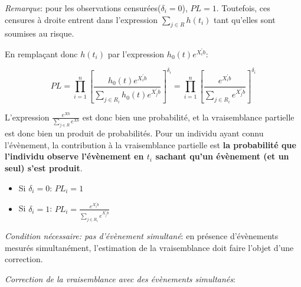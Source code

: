 \documentclass[
  12pt,
  letterpaper,
  DIV=11,
  numbers=noendperiod,
  onepage,
  openany]{scrreprt}
\begin{document}
\emph{Remarque}: pour les observations censurées(\(\delta_i=0\)),
\(PL=1\). Toutefois, ces censures à droite entrent dans l'expression
\(\sum_{j\in R}h(t_i)\) tant qu'elles sont soumises au risque.

En remplaçant donc \(h(t_i)\) par l'expression \(h_0(t)e^{X_i^{'}b}\):

\[PL=\prod_{i=1}^{n}\left[\frac{h_0(t)e^{X_{i}^{'}b}}{\sum_{j\in R_i}h_0(t)e^{X_{j}^{'}b}}\right]^{\delta_i} =\prod_{i=1}^{n}\left[\frac{e^{X_i^{'}b}}{\sum_{j\in R_i}e^{X_{j}^{'}b}}\right]^{\delta_i}\]

L'expression \(\frac{e^{Xb}}{\sum_{j\in R}e^{Xb}}\) est donc bien une
probabilité, et la vraisemblance partielle est donc bien un produit de
probabilités. Pour un individu ayant connu l'évènement, la contribution
à la vraisemblance partielle est \textbf{la probabilité que l'individu
observe l'évènement en \(t_i\) sachant qu'un évènement (et un seul)
s'est produit}.

\begin{itemize}
\item
  Si \(\delta_i = 0\): \(PL_i = 1\)
\item
  Si \(\delta_i = 1\):
  \(PL_i =\frac{e^{X_i^{'}b}}{\sum_{j\in R_i}e^{X_{j}^{'}b}}\)
\end{itemize}

\emph{Condition nécessaire: pas d'évènement simultané}: en présence
d'évènements mesurés simultanément, l'estimation de la vraisemblance
doit faire l'objet d'une correction.

\emph{Correction de la vraisemblance avec des évènements simultanés}:
\end{document}

